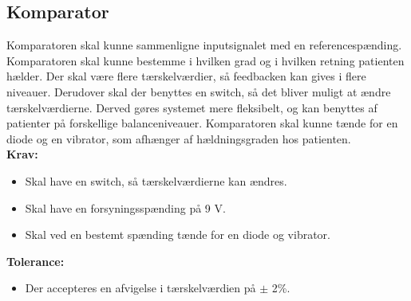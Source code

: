 \subsection{Komparator}
Komparatoren skal kunne sammenligne inputsignalet med en referencespænding. Komparatoren skal kunne bestemme i hvilken grad og i hvilken retning patienten hælder. Der skal være flere tærskelværdier, så feedbacken kan gives i flere niveauer. Derudover skal der benyttes en switch, så det bliver muligt at ændre tærskelværdierne. Derved gøres systemet mere fleksibelt, og kan benyttes af patienter på forskellige balanceniveauer. Komparatoren skal kunne tænde for en diode og en vibrator, som afhænger af hældningsgraden hos patienten. \\
\textbf{Krav:}
\begin{itemize}
\item Skal have en switch, så tærskelværdierne kan ændres.
\item Skal have en forsyningsspænding på 9 V.
\item Skal ved en bestemt spænding tænde for en diode og vibrator.
\end{itemize}
\textbf{Tolerance:}
\begin{itemize}
\item Der accepteres en afvigelse i tærskelværdien på $\pm$ 2\%.
\end{itemize}

